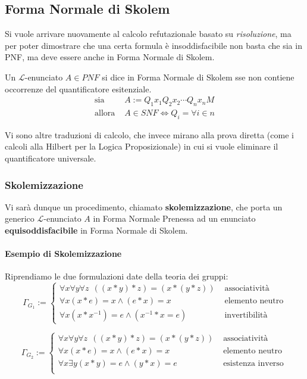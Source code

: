\subsection{Forma Normale di Skolem}
Si vuole arrivare nuovamente al calcolo refutazionale basato su \textit{risoluzione}, ma per poter dimostrare che una certa formula è insoddisfacibile non basta che sia in PNF, ma deve essere anche in Forma Normale di Skolem. 

\begin{defi}
Un $\mathscr{L}$-enunciato $A \in PNF$ si dice in Forma Normale di Skolem sse non contiene occorrenze del quantificatore esitenziale.
\begin{align*}
\text{sia } & A := Q_1 x_1 Q_2 x_2 \cdots Q_n x_n M \\
\text{allora } &  A \in SNF \iff Q_i = \forall i \in n
\end{align*}
\end{defi}

Vi sono altre traduzioni di calcolo, che invece mirano alla prova diretta 
(come i calcoli alla Hilbert per la Logica Proposizionale) in cui si vuole 
eliminare il quantificatore universale. 

\subsubsection{Skolemizzazione}
Vi sarà dunque un procedimento, chiamato \textbf{skolemizzazione}, 
che porta un generico $\mathscr{L}$-enunciato $A$ in 
Forma Normale Prenessa ad un enunciato \textbf{equisoddisfacibile} in Forma Normale 
di Skolem.

\paragraph{Esempio di Skolemizzazione}
Riprendiamo le due formulazioni date della teoria dei gruppi: 
$$
\Gamma_{G_1} := 
  \begin{cases}
    \forall x \forall y \forall z  ~~ ((x * y) * z) = (x * (y * z))  & \text{ associatività}\\
    \forall x (x * e) = x \land (e * x) = x  & \text{ elemento neutro}\\
    \forall x (x * x^{-1}) = e \land (x^{-1} * x = e) & \text{ invertibilità}
  \end{cases}
$$

$$
        \Gamma_{G_2} := 
                \begin{cases}
                        \forall x \forall y \forall z  ~~ ((x * y) * z) = (x * (y * z)) & \text{ associatività}\\
                        \forall x (x * e) = x \land (e * x) = x & \text{ elemento neutro } \\
                        \forall x \exists y (x * y) = e \land (y * x) = e & \text{ esistenza inverso} \\
                \end{cases}
$$


